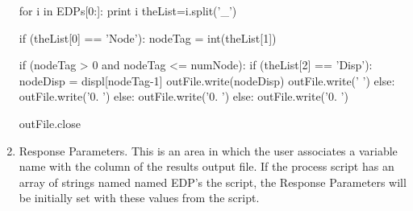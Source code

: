 \begin{enumerate}
\begin{python}
for i in EDPs[0:]:
    print i
    theList=i.split('_')

    if (theList[0] == 'Node'):
        nodeTag = int(theList[1])

        if (nodeTag > 0 and nodeTag <= numNode):
            if (theList[2] == 'Disp'):
                nodeDisp = displ[nodeTag-1]
                outFile.write(nodeDisp)
                outFile.write(' ')
            else:
                outFile.write('0. ')
        else:
            outFile.write('0. ')
    else:
        outFile.write('0. ')

outFile.close
\end{python}



\item Response Parameters. This is an area in which the user
  associates a variable name with the column of the results output
  file. If the process script has an array of strings named named
  EDP's the script, the Response Parameters will be initially set with
  these values from the script.
\end{enumerate}

